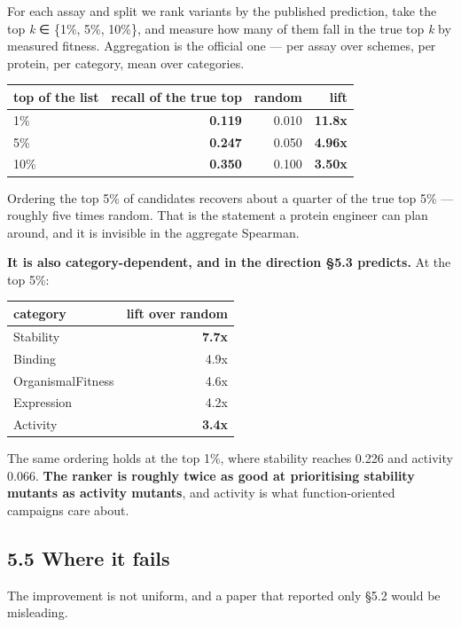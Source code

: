 For each assay and split we rank variants by the published prediction, take the top \emph{k} ∈ \{1\%, 5\%, 10\%\},
and measure how many of them fall in the true top \emph{k} by measured fitness. Aggregation is the official
one --- per assay over schemes, per protein, per category, mean over categories.

\begin{longtable}[]{@{}lrrr@{}}
\toprule
top of the list & recall of the true top & random & lift \\
\midrule
\endhead
1\% & \textbf{0.119} & 0.010 & \textbf{11.8x} \\
5\% & \textbf{0.247} & 0.050 & \textbf{4.96x} \\
10\% & \textbf{0.350} & 0.100 & \textbf{3.50x} \\
\bottomrule
\end{longtable}

Ordering the top 5\% of candidates recovers about a quarter of the true top 5\% --- roughly five times
random. That is the statement a protein engineer can plan around, and it is invisible in the aggregate
Spearman.

\textbf{It is also category-dependent, and in the direction §5.3 predicts.} At the top 5\%:

\begin{longtable}[]{@{}lr@{}}
\toprule
category & lift over random \\
\midrule
\endhead
Stability & \textbf{7.7x} \\
Binding & 4.9x \\
OrganismalFitness & 4.6x \\
Expression & 4.2x \\
Activity & \textbf{3.4x} \\
\bottomrule
\end{longtable}

The same ordering holds at the top 1\%, where stability reaches 0.226 and activity 0.066. \textbf{The ranker is
roughly twice as good at prioritising stability mutants as activity mutants}, and activity is what
function-oriented campaigns care about.

\hypertarget{where-it-fails}{%
\subsection{5.5 Where it fails}\label{where-it-fails}}

The improvement is not uniform, and a paper that reported only §5.2 would be misleading.

